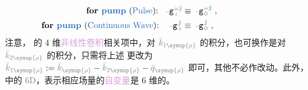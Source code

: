 \begin{subequations} \label{eq:Nondepleted-Pump-Approximation}
\begin{align}
	\hspace{-7em} \text{\textbf{for \textcolor{NavyBlue}{pump}} (\textcolor{NavyBlue}{Pulse}):} \hspace{0.65em} \xint{\begin{smallmatrix} ~ \\ {}^{}_{\mathcolor{gray}{-}} \\ ~ \end{smallmatrix}}{09}{\mathtt{g}}^{\;\! \mathcolor{gray}{\omega} \textcolor{PineGreen}{\hat{\jmath}}}_{\;\! \mathcolor{gray}{z}} &\equiv \xint{\begin{smallmatrix} ~ \\ {}^{}_{\mathcolor{gray}{-}} \\ ~ \end{smallmatrix}}{09}{\mathtt{g}}^{\;\!  \mathcolor{gray}{\omega} \textcolor{PineGreen}{\hat{\jmath}}}_{\;\! \mathcolor{gray}{0}} ~, \label{eq:Nondepleted-Pump-Approximation-spectrum} \\
	\hspace{-7em} \text{\textbf{for \textcolor{NavyBlue}{pump}} (\textcolor{NavyBlue}{Continuous Wave}):} \hspace{1em} \xint{\begin{smallmatrix} ~ \\ {}^{}_{\mathcolor{gray}{-}} \\ ~ \end{smallmatrix}}{09}{\mathtt{g}}^{\;\! \textcolor{PineGreen}{\hat{\jmath}}}_{\;\! \mathcolor{gray}{z}} &\equiv \xint{\begin{smallmatrix} ~ \\ {}^{}_{\mathcolor{gray}{-}} \\ ~ \end{smallmatrix}}{09}{\mathtt{g}}^{\;\! \textcolor{PineGreen}{\hat{\jmath}}}_{\;\! \mathcolor{gray}{0}} ~, \label{eq:Nondepleted-Pump-Approximation-discrete}
\end{align}
\end{subequations}
注意， 的 4 维\textcolor{Plum}{非线性卷积}相关项中，对 $\mathcolor{gray}{\bar{k}_{1\symup{\rho}}}$ 的积分，也可换作是对 $\mathcolor{gray}{\bar{k}_{2\symup{\rho}}}$ 的积分，只需将上述  更改为 $\mathcolor{gray}{\bar{k}_{1\symup{\rho}}} := \mathcolor{gray}{\bar{k}_{\symup{\rho}}} - \mathcolor{gray}{\bar{k}_{2\symup{\rho}}} - \mathcolor{gray}{\bar{q}_{\symup{\rho}}}$ 即可，其他不必作改动。此外， 中的 \textcolor{gray}{6D}，表示相应\textcolor{NavyBlue}{场量}的\textcolor{Plum}{自变量}是 6 维的。

